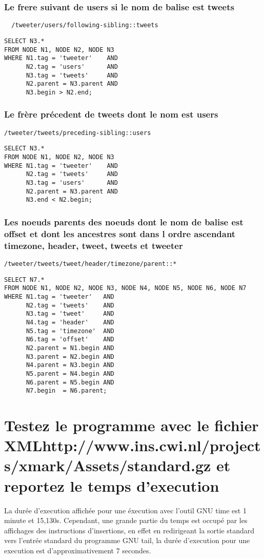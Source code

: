 \subsubsection{Le frere suivant de users si le nom de balise est tweets}
\begin{verbatim}
  /tweeter/users/following-sibling::tweets
\end{verbatim}
\begin{verbatim}
SELECT N3.*
FROM NODE N1, NODE N2, NODE N3
WHERE N1.tag = 'tweeter'    AND
      N2.tag = 'users'      AND
      N3.tag = 'tweets'     AND
      N2.parent = N3.parent AND
      N3.begin > N2.end;
\end{verbatim}

\subsubsection{Le frère précedent de tweets dont le nom est users}
\begin{verbatim}
/tweeter/tweets/preceding-sibling::users
\end{verbatim}
\begin{verbatim}
SELECT N3.*
FROM NODE N1, NODE N2, NODE N3
WHERE N1.tag = 'tweeter'    AND
      N2.tag = 'tweets'     AND
      N3.tag = 'users'      AND
      N2.parent = N3.parent AND
      N3.end < N2.begin;
\end{verbatim}

\subsubsection{Les noeuds parents des noeuds dont le nom de balise est offset et dont les ancestres sont dans l ordre ascendant timezone, header, tweet, tweets et tweeter}
\begin{verbatim}
/tweeter/tweets/tweet/header/timezone/parent::*
\end{verbatim}
\begin{verbatim}
SELECT N7.*
FROM NODE N1, NODE N2, NODE N3, NODE N4, NODE N5, NODE N6, NODE N7
WHERE N1.tag = 'tweeter'   AND
      N2.tag = 'tweets'    AND
      N3.tag = 'tweet'     AND
      N4.tag = 'header'    AND
      N5.tag = 'timezone'  AND
      N6.tag = 'offset'    AND
      N2.parent = N1.begin AND
      N3.parent = N2.begin AND
      N4.parent = N3.begin AND
      N5.parent = N4.begin AND
      N6.parent = N5.begin AND
      N7.begin  = N6.parent;
\end{verbatim}

\section{Testez le programme avec le fichier XMLhttp://www.ins.cwi.nl/projects/xmark/Assets/standard.gz et reportez le temps d’execution}
La durée d'execution affichée pour une éxecution avec l'outil GNU time est 1 minute et 15,130s. Cependant, une grande partie du temps est occupé par les affichages des instructions d'insertions, en effet en redirigeant la sortie standard vers l'entrée standard du programme GNU tail, la durée d'execution pour une execution est d'approximativement 7 secondes.

